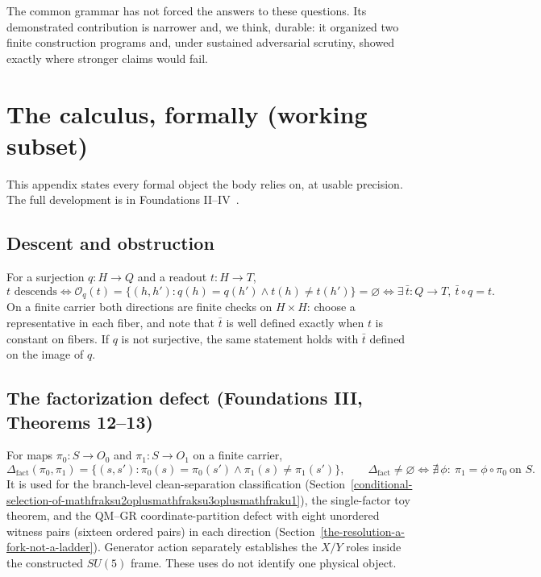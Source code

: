 \documentclass[11pt]{article}
\newcommand{\Deltafact}{\Delta_{\mathrm{fact}}}
\theoremstyle{definition}
\begin{document}
The common grammar has not forced the answers to these questions. Its demonstrated contribution is narrower and, we
think, durable: it organized two finite construction programs and, under sustained adversarial scrutiny, showed exactly
where stronger claims would fail.
 
\appendix
\section{The calculus, formally (working subset)}\label{the-calculus-formally-working-subset}

This appendix states every formal object the body relies on, at usable precision. The full development is in
Foundations II--IV~\citep{Tsiokos_FoundationsII,Tsiokos_FoundationsIII,Tsiokos_FoundationsIV}.

\subsection{Descent and obstruction}\label{descent-and-obstruction}

For a surjection \(q:H\to Q\) and a readout \(t:H\to T\),
\[
t \text{ descends} \iff \mathcal O_q(t) = \{(h,h'): q(h)=q(h') \wedge t(h)\neq t(h')\} = \varnothing
\iff \exists\,\bar t:Q\to T,\ \bar t\circ q = t .
\]
On a finite carrier both directions are finite checks on \(H\times H\): choose a representative in each fiber, and
note that \(\bar t\) is well defined exactly when \(t\) is constant on fibers. If \(q\) is not surjective, the same
statement holds with \(\bar t\) defined on the image of \(q\).

\subsection{The factorization defect (Foundations III, Theorems 12--13)}\label{strict-extension-and-the-factorization-defect-fiii-thms-1213}

For maps \(\pi_0:S\to O_0\) and \(\pi_1:S\to O_1\) on a finite carrier,
\[
\Deltafact(\pi_0,\pi_1) = \{(s,s'): \pi_0(s)=\pi_0(s') \wedge \pi_1(s)\neq\pi_1(s')\},
\qquad
\Deltafact\neq\varnothing \iff \nexists\,\phi:\ \pi_1 = \phi\circ\pi_0 \ \text{on } S .
\]
It is used for the branch-level clean-separation classification
(Section~\ref{conditional-selection-of-mathfraksu2oplusmathfraksu3oplusmathfraku1}), the single-factor toy theorem,
and the QM--GR coordinate-partition defect with eight unordered witness pairs (sixteen ordered pairs) in each direction
(Section~\ref{the-resolution-a-fork-not-a-ladder}). Generator action separately establishes the \(X/Y\) roles inside
the constructed \(SU(5)\) frame. These uses do not identify one physical object.
\end{document}
